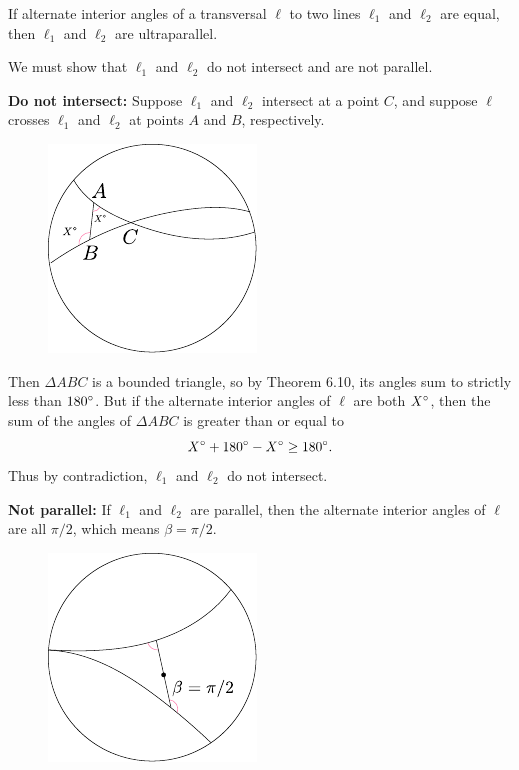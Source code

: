 \documentclass[twoside,10pt]{article}
\begin{document}

\begin{exer}[6.17]
If alternate interior angles of a transversal $\ell$ to two lines $\ell_1$ and $\ell_2$ are equal, then $\ell_1$ and $\ell_2$ are ultraparallel.
\end{exer}

We must show that $\ell_1$ and $\ell_2$ do not intersect and are not parallel.

\textbf{Do not intersect:} Suppose $\ell_1$ and $\ell_2$ intersect at a point $C$, and suppose $\ell$ crosses $\ell_1$ and $\ell_2$ at points $A$ and $B$, respectively.

\begin{figure}[H]
	\centering
	\includegraphics[scale=1.5]{fig/17a.pdf}
\end{figure}

Then $\Delta ABC$ is a bounded triangle, so by Theorem 6.10, its angles sum to strictly less than $180^\circ$. But if the alternate interior angles of $\ell$ are both $X^\circ$, then the sum of the angles of $\Delta ABC$ is greater than or equal to
\[
X^\circ + 180^\circ - X^\circ \geq 180^\circ .
\] Thus by contradiction, $\ell_1$ and $\ell_2$ do not intersect.

\textbf{Not parallel:} If $\ell_1$ and $\ell_2$ are parallel, then the alternate interior angles of $\ell$ are all $\pi/2$, which means $\beta=\pi/2$.

\begin{figure}[H]
	\centering
	\includegraphics[scale=1.5]{fig/17b.pdf}
\end{figure}
\end{document}
